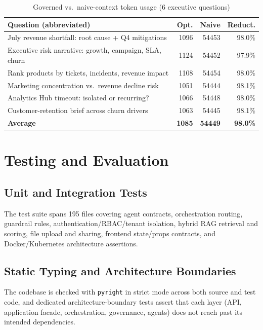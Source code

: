 \documentclass[conference]{IEEEtran}
\begin{document}
\begin{table}[t]
\centering
\caption{Governed vs.\ naive-context token usage (6 executive questions)}
\label{tab:token-savings}
\footnotesize
\begin{tabular}{@{}p{3.5cm}rrr@{}}
\toprule
\textbf{Question (abbreviated)} & \textbf{Opt.} & \textbf{Naive} & \textbf{Reduct.} \\
\midrule
July revenue shortfall: root cause + Q4 mitigations & 1096 & 54453 & 98.0\% \\
Executive risk narrative: growth, campaign, SLA, churn & 1124 & 54452 & 97.9\% \\
Rank products by tickets, incidents, revenue impact & 1108 & 54454 & 98.0\% \\
Marketing concentration vs.\ revenue decline risk & 1051 & 54444 & 98.1\% \\
Analytics Hub timeout: isolated or recurring? & 1066 & 54448 & 98.0\% \\
Customer-retention brief across churn drivers & 1063 & 54445 & 98.1\% \\
\midrule
\textbf{Average} & \textbf{1085} & \textbf{54449} & \textbf{98.0\%} \\
\bottomrule
\end{tabular}
\end{table}

\section{Testing and Evaluation}
\label{sec:testing}

\subsection{Unit and Integration Tests}
The test suite spans 195 files covering agent contracts, orchestration
routing, guardrail rules, authentication/RBAC/tenant isolation, hybrid RAG
retrieval and scoring, file upload and sharing, frontend state/props
contracts, and Docker/Kubernetes architecture assertions.

\subsection{Static Typing and Architecture Boundaries}
The codebase is checked with \texttt{pyright} in strict mode across both
source and test code, and dedicated architecture-boundary tests assert
that each layer (API, application facade, orchestration, governance,
agents) does not reach past its intended dependencies.
\end{document}
